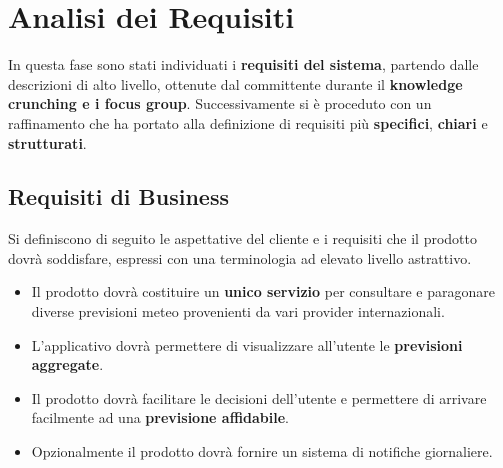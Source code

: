 

\chapter{Analisi dei Requisiti}
In questa fase sono stati individuati i \textbf{requisiti del sistema}, partendo dalle descrizioni di alto livello, ottenute dal committente durante il \textbf{knowledge crunching e i focus group}. Successivamente si è proceduto con un raffinamento che ha portato alla definizione di requisiti più \textbf{specifici}, \textbf{chiari} e \textbf{strutturati}.
	
	\section{Requisiti di Business}
	Si definiscono di seguito le aspettative del cliente e i requisiti che il prodotto dovrà soddisfare, espressi con una terminologia ad elevato livello astrattivo.
        \begin{itemize}
        \item Il prodotto dovrà costituire un \textbf{unico servizio} per consultare e paragonare diverse previsioni meteo provenienti da vari provider internazionali.
        \item L'applicativo dovrà permettere di visualizzare all'utente le \textbf{previsioni aggregate}. 
            
            \item Il prodotto dovrà facilitare le decisioni dell'utente e permettere di arrivare facilmente ad una \textbf{previsione affidabile}. 
            \item Opzionalmente il prodotto dovrà fornire un sistema di notifiche giornaliere. 
            
        \end{itemize}
	
